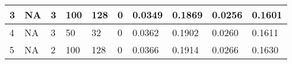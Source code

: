 \begin{table}
{\begin{tabular}{|llllllllll|}
3             & NA                                                              & 3                                                               & 100            & 128                                                            & 0                & 0.0349                                                                    & 0.1869                                                                   & 0.0256                                                               & 0.1601                                                              \\ \hline
4             & NA                                                              & 3                                                               & 50             & 32                                                             & 0                & 0.0362                                                                    & 0.1902                                                                   & 0.0260                                                               & 0.1611                                                              \\ \hline
5             & NA                                                              & 2                                                               & 100            & 128                                                            & 0                & 0.0366                                                                    & 0.1914                                                                   & 0.0266                                                               & 0.1630                                                              \\ \hline
\end{tabular}}
\end{table}
